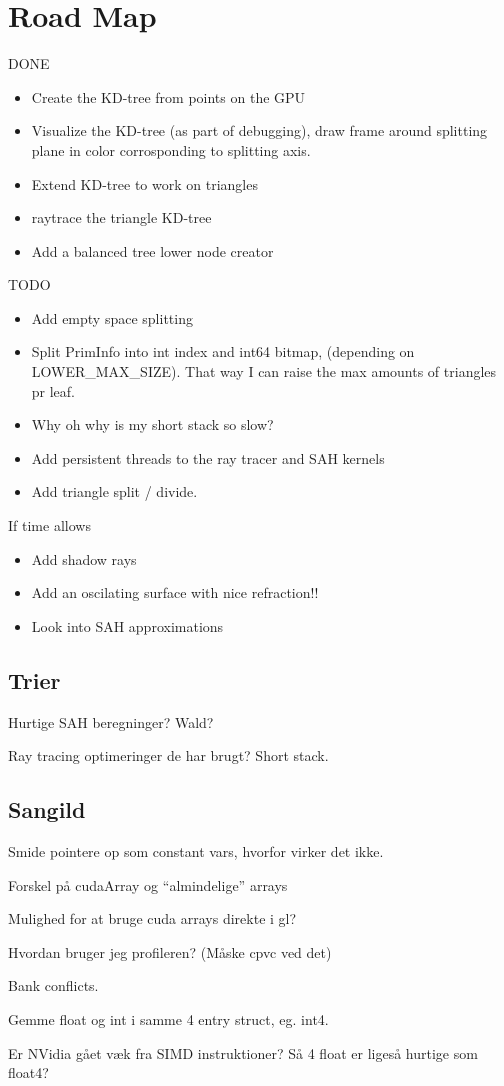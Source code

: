 \section*{Road Map}


DONE
\begin{itemize}
\item Create the KD-tree from points on the GPU
\item Visualize the KD-tree (as part of debugging), draw frame around
  splitting plane in color corrosponding to splitting axis.
\item Extend KD-tree to work on triangles
\item raytrace the triangle KD-tree
\item Add a balanced tree lower node creator
\end{itemize}

TODO
\begin{itemize}
\item Add empty space splitting
\item Split PrimInfo into int index and int64 bitmap, (depending on
  LOWER\_MAX\_SIZE). That way I can raise the max amounts of triangles
  pr leaf.
\item Why oh why is my short stack so slow?
\item Add persistent threads to the ray tracer and SAH kernels
\item Add triangle split / divide.
\end{itemize}

If time allows

\begin{itemize}
\item Add shadow rays
\item Add an oscilating surface with nice refraction!!
\item Look into SAH approximations
\end{itemize}



\subsection*{Trier}

Hurtige SAH beregninger? Wald?

Ray tracing optimeringer de har brugt? Short stack.


\subsection*{Sangild}

Smide pointere op som constant vars, hvorfor virker det ikke.

Forskel på cudaArray og ``almindelige'' arrays

Mulighed for at bruge cuda arrays direkte i gl?

Hvordan bruger jeg profileren? (Måske cpvc ved det)

Bank conflicts.

Gemme float og int i samme 4 entry struct, eg. int4.

Er NVidia gået væk fra SIMD instruktioner? Så 4 float er ligeså
hurtige som float4?
